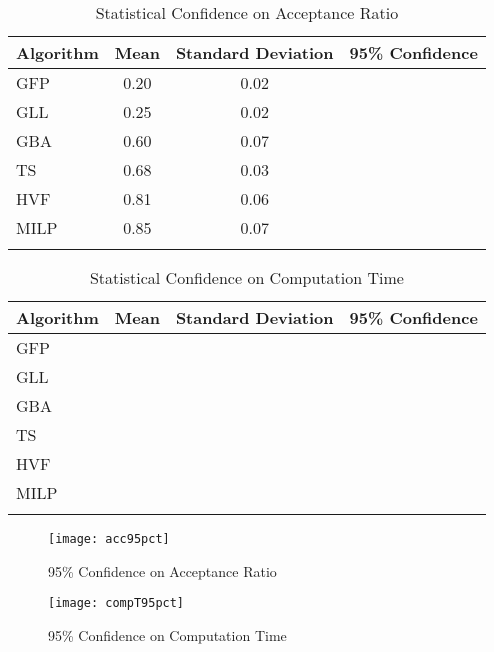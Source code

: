 \documentclass[conference]{IEEEtran}
\begin{document}
\begin{table}[t]
      \caption{Statistical Confidence on Acceptance Ratio}
      \centering
      \renewcommand{\arraystretch}{1.3}
\begin{tabular}{l c c c}\hline
 Algorithm &  Mean & Standard Deviation &  95\% Confidence\\
\hline\hline
GFP & 0.20  & 0.02 &  \\
GLL & 0.25 & 0.02 &  \\
GBA & 0.60 & 0.07 &  \\
TS & 0.68 & 0.03 &  \\
HVF & 0.81 & 0.06 &  \\
MILP & 0.85 & 0.07 &  \\
\hline
\label{Tacc95}
\end{tabular}
\end{table}    
    
    
\begin{table}[t]    
      \centering
      \renewcommand{\arraystretch}{1.3}
        \caption{\scriptsize Statistical Confidence on Computation Time}
\begin{tabular}{l c c c}\hline
 Algorithm &  Mean & Standard Deviation &  95\% Confidence\\
\hline\hline
GFP &  &  &  \\
GLL &  &  &  \\
GBA &  &  &  \\
TS &  &  &  \\
HVF &  &  &  \\
MILP &  &  &  \\
\hline
\label{Tacc951}
\end{tabular}
\end{table}

\begin{figure*}[t]
\setlength{\abovecaptionskip}{7pt plus 0pt minus 0pt}
\setlength{\belowcaptionskip}{7pt plus 0pt minus 0pt}

\begin{minipage}{.49\textwidth}
\resizebox{.99\textwidth}{!}
{\texttt{[image: acc95pct]}}
  \caption{95\% Confidence on Acceptance Ratio}
  \label{acc95pct}
\end{minipage}
\begin{minipage}{.49\textwidth}
\resizebox{.99\textwidth}{!}
{\texttt{[image: compT95pct]}}
  \caption{95\% Confidence on Computation Time}
  \label{compT95pct}
\end{minipage}
\end{figure*}
\end{document}
